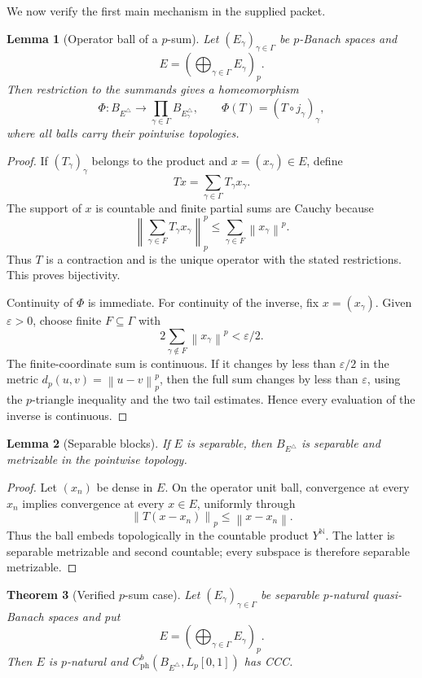 \documentclass[11pt]{article}
\newtheorem{theorem}{Theorem}[section]
\newtheorem{lemma}[theorem]{Lemma}
\theoremstyle{definition}
\newcommand{\N}{\mathbb N}
\newcommand{\Lp}{L_p[0,1]}
\newcommand{\cph}{C_{\mathrm{ph}}^b}
\newcommand{\norm}[1]{\left\lVert #1\right\rVert}
\begin{document}
We now verify the first main mechanism in the supplied packet.

\begin{lemma}[Operator ball of a $p$-sum]
\label{lem:psum-product}
Let $(E_\gamma)_{\gamma\in\Gamma}$ be $p$-Banach spaces and
\[
 E=\left(\bigoplus_{\gamma\in\Gamma}E_\gamma\right)_p.
\]
Then restriction to the summands gives a homeomorphism
\[
 \Phi:B_{E^\triangle}\longrightarrow
 \prod_{\gamma\in\Gamma}B_{E_\gamma^\triangle},
 \qquad
 \Phi(T)=(T\circ j_\gamma)_\gamma,
\]
where all balls carry their pointwise topologies.
\end{lemma}

\begin{proof}
If $(T_\gamma)_\gamma$ belongs to the product and $x=(x_\gamma)\in E$, define
\[
 Tx=\sum_{\gamma\in\Gamma}T_\gamma x_\gamma.
\]
The support of $x$ is countable and finite partial sums are Cauchy because
\[
 \norm{\sum_{\gamma\in F}T_\gamma x_\gamma}_p^p
 \leq\sum_{\gamma\in F}\norm{x_\gamma}^p.
\]
Thus $T$ is a contraction and is the unique operator with the stated
restrictions.  This proves bijectivity.

Continuity of $\Phi$ is immediate.  For continuity of the inverse, fix
$x=(x_\gamma)$.  Given $\varepsilon>0$, choose finite $F\subseteq\Gamma$ with
\[
 2\sum_{\gamma\notin F}\norm{x_\gamma}^p<\varepsilon/2.
\]
The finite-coordinate sum is continuous.  If it changes by less than
$\varepsilon/2$ in the metric $d_p(u,v)=\norm{u-v}_p^p$, then the full sum changes
by less than $\varepsilon$, using the $p$-triangle inequality and the two tail
estimates.  Hence every evaluation of the inverse is continuous.
\end{proof}

\begin{lemma}[Separable blocks]
\label{lem:sep-ball}
If $E$ is separable, then $B_{E^\triangle}$ is separable and metrizable in the
pointwise topology.
\end{lemma}

\begin{proof}
Let $(x_n)$ be dense in $E$.  On the operator unit ball, convergence at every
$x_n$ implies convergence at every $x\in E$, uniformly through
\[
 \norm{T(x-x_n)}_p\leq\norm{x-x_n}.
\]
Thus the ball embeds topologically in the countable product $Y^\N$.  The latter
is separable metrizable and second countable; every subspace is therefore
separable metrizable.
\end{proof}

\begin{theorem}[Verified $p$-sum case]
\label{thm:psum}
Let $(E_\gamma)_{\gamma\in\Gamma}$ be separable $p$-natural quasi-Banach spaces
and put
\[
 E=\left(\bigoplus_{\gamma\in\Gamma}E_\gamma\right)_p.
\]
Then $E$ is $p$-natural and $\cph(B_{E^\triangle},\Lp)$ has CCC.
\end{theorem}
\end{document}
